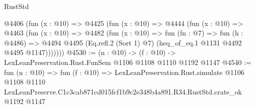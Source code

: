 \begin{lexlean}{RustStd}
\begin{coremodule}
    @4406
      (fun (x : @10) =>
      @4425
        (fun (x : @10) =>
        @4444
          (fun (x : @10) =>
          @4463
            (fun (x : @10) =>
            @4482
              (fun (x : @10) =>
              fun (fn : @7) =>
              fun (h : @4486) =>
              @4494 @4495 (Eq.refl.{2} (Sort 1) @7) (heq_of_eq.{1} @1131 @4492 @4495 @1147)))))))
@4530 := (n : @10) -> (f : @10) -> LexLeanPreservation.Rust.FunSem @1106 @1108 @1110 @1192 @1147
@4540 := fun (n : @10) =>
  fun (f : @10) =>
  LexLeanPreservation.Rust.simulate
    @1106
    @1108
    @1110
    LexLeanPreserve.C1c3cab871cd015fcf1b9c2e348b4a891.R34.RustStd.crate_ok
    @1192
    @1147
\end{coremodule}
\end{lexlean}
